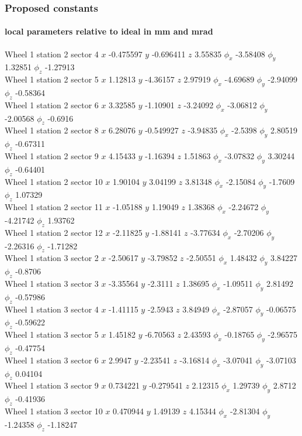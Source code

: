 \documentclass[compress]{beamer}
\begin{document}
\begin{frame}
\frametitle{Proposed constants}
\framesubtitle{local parameters relative to ideal in mm and mrad}

\tiny

Wheel 1 station 2 sector 4 $x$ -0.475597 $y$ -0.696411 $z$ 3.55835 $\phi_x$ -3.58408 $\phi_y$ 1.32851 $\phi_z$ -1.27913 \\
Wheel 1 station 2 sector 5 $x$ 1.12813 $y$ -4.36157 $z$ 2.97919 $\phi_x$ -4.69689 $\phi_y$ -2.94099 $\phi_z$ -0.58364 \\
Wheel 1 station 2 sector 6 $x$ 3.32585 $y$ -1.10901 $z$ -3.24092 $\phi_x$ -3.06812 $\phi_y$ -2.00568 $\phi_z$ -0.6916 \\
Wheel 1 station 2 sector 8 $x$ 6.28076 $y$ -0.549927 $z$ -3.94835 $\phi_x$ -2.5398 $\phi_y$ 2.80519 $\phi_z$ -0.67311 \\
Wheel 1 station 2 sector 9 $x$ 4.15433 $y$ -1.16394 $z$ 1.51863 $\phi_x$ -3.07832 $\phi_y$ 3.30244 $\phi_z$ -0.64401 \\
Wheel 1 station 2 sector 10 $x$ 1.90104 $y$ 3.04199 $z$ 3.81348 $\phi_x$ -2.15084 $\phi_y$ -1.7609 $\phi_z$ 1.07329 \\
Wheel 1 station 2 sector 11 $x$ -1.05188 $y$ 1.19049 $z$ 1.38368 $\phi_x$ -2.24672 $\phi_y$ -4.21742 $\phi_z$ 1.93762 \\
Wheel 1 station 2 sector 12 $x$ -2.11825 $y$ -1.88141 $z$ -3.77634 $\phi_x$ -2.70206 $\phi_y$ -2.26316 $\phi_z$ -1.71282 \\
Wheel 1 station 3 sector 2 $x$ -2.50617 $y$ -3.79852 $z$ -2.50551 $\phi_x$ 1.48432 $\phi_y$ 3.84227 $\phi_z$ -0.8706 \\
Wheel 1 station 3 sector 3 $x$ -3.35564 $y$ -2.3111 $z$ 1.38695 $\phi_x$ -1.09511 $\phi_y$ 2.81492 $\phi_z$ -0.57986 \\
Wheel 1 station 3 sector 4 $x$ -1.41115 $y$ -2.5943 $z$ 3.84949 $\phi_x$ -2.87057 $\phi_y$ -0.06575 $\phi_z$ -0.59622 \\
Wheel 1 station 3 sector 5 $x$ 1.45182 $y$ -6.70563 $z$ 2.43593 $\phi_x$ -0.18765 $\phi_y$ -2.96575 $\phi_z$ -0.47754 \\
Wheel 1 station 3 sector 6 $x$ 2.9947 $y$ -2.23541 $z$ -3.16814 $\phi_x$ -3.07041 $\phi_y$ -3.07103 $\phi_z$ 0.04104 \\
Wheel 1 station 3 sector 9 $x$ 0.734221 $y$ -0.279541 $z$ 2.12315 $\phi_x$ 1.29739 $\phi_y$ 2.8712 $\phi_z$ -0.41936 \\
Wheel 1 station 3 sector 10 $x$ 0.470944 $y$ 1.49139 $z$ 4.15344 $\phi_x$ -2.81304 $\phi_y$ -1.24358 $\phi_z$ -1.18247 \\

\end{frame}
\end{document}
